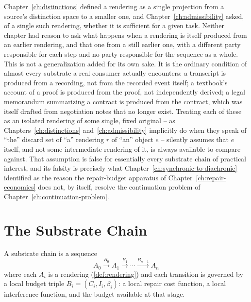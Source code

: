 Chapter~\ref{ch:distinctions} defined a rendering as a single projection
from a source's distinction space to a smaller one, and
Chapter~\ref{ch:admissibility} asked, of a single such rendering, whether
it is sufficient for a given task. Neither chapter had reason to ask what
happens when a rendering is itself produced from an earlier rendering, and
that one from a still earlier one, with a different party responsible for
each step and no party responsible for the sequence as a whole. This is
not a generalization added for its own sake. It is the ordinary condition
of almost every substrate a real consumer actually encounters: a
transcript is produced from a recording, not from the recorded event
itself; a textbook's account of a proof is produced from the proof, not
independently derived; a legal memorandum summarizing a contract is
produced from the contract, which was itself drafted from negotiation
notes that no longer exist. Treating each of these as an isolated
rendering of some single, fixed original -- as Chapters~\ref{ch:distinctions}
and~\ref{ch:admissibility} implicitly do when they speak of ``the''
discard set of ``a'' rendering $r$ of ``an'' object $e$ -- silently assumes
that $e$ itself, and not some intermediate rendering of it, is always
available to compare against. That assumption is false for essentially
every substrate chain of practical interest, and its falsity is precisely
what Chapter~\ref{ch:synchronic-to-diachronic} identified as the reason
the repair-budget apparatus of Chapter~\ref{ch:repair-economics} does not,
by itself, resolve the continuation problem of
Chapter~\ref{ch:continuation-problem}.

\section{The Substrate Chain}

\begin{definition}
\label{def:substrate-chain}
A substrate chain is a sequence
\[
A_0 \xrightarrow{B_0} A_1 \xrightarrow{B_1} \cdots \xrightarrow{B_{n-1}} A_n
\]
where each $A_i$ is a rendering (\cref{def:rendering}) and each transition
is governed by a local budget triple $B_i = (C_i, I_i, \beta_i)$: a local
repair cost function, a local interference function, and the budget
available at that stage.
\end{definition}

